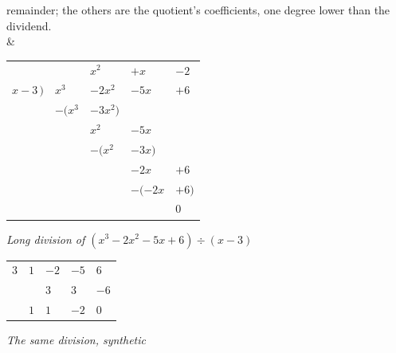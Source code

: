 \documentclass[10pt]{article}
\newcommand{\dstrut}{\rule[-3.5pt]{0pt}{12pt}}
\begin{document}
\begin{guidednotes}
remainder; the others are the quotient's coefficients, one degree lower than the dividend.
\\
& \begin{minipage}[c]{0.56\linewidth}\centering
{\setlength{\tabcolsep}{1.5pt}\begin{tabular}{@{}>{\dstrut}r@{\,}TTTT@{}}
             &          & \textbf{\color{plum}$x^2$} & \textbf{\color{plum}$+x$} & \textbf{\color{plum}$-2$} \\ 
 $x-3\,\big)$ & $x^3$    & $-2x^2$  & $-5x$    & $+6$   \\
             & $-(x^3$  & $-3x^2)$ &          &        \\ 
             &          & $x^2$    & $-5x$    &        \\
             &          & $-(x^2$  & $-3x)$   &        \\ 
             &          &          & $-2x$    & $+6$   \\
             &          &          & $-(-2x$  & $+6)$  \\ 
             &          &          &          & \textbf{\color{redacc}$0$} \\
\end{tabular}}

\vspace{2pt}
{\footnotesize\itshape Long division of $(x^3 - 2x^2 - 5x + 6) \div (x - 3)$}
\end{minipage}\hfill
\begin{minipage}[c]{0.42\linewidth}\centering
{\setlength{\tabcolsep}{2pt}\begin{tabular}{@{}>{\dstrut}K|KKKK@{}}
 $3$ & $1$ & $-2$ & $-5$ & $6$ \\
     &     & $3$  & $3$  & $-6$ \\ 
     & \textbf{\color{plum}$1$} & \textbf{\color{plum}$1$} & \textbf{\color{plum}$-2$} & \textbf{\color{redacc}$0$} \\
\end{tabular}}

\vspace{2pt}
{\footnotesize\itshape The same division, synthetic}


\end{minipage}
\end{guidednotes}
\end{document}
